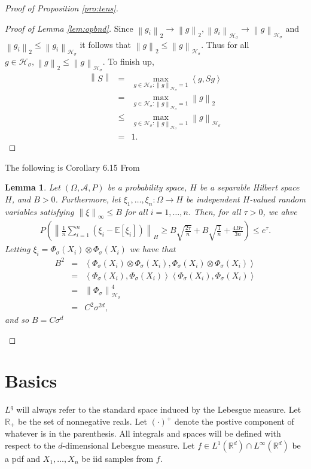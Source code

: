 \documentclass{article} %
\def\hsig{{\mathcal{H}_\sigma}}
\def\fm{{\Phi_\sigma}} %
\def\rn{\mathbb{R}}
\def\l{\left}
\def\r{\right}
\newtheorem{lem}{Lemma}
\theoremstyle{definition}
\begin{document}
\begin{proof}[Proof of Proposition \ref{pro:tens}]
\begin{proof}[Proof of Lemma \ref{lem:opbnd}]
                    Since $\l\| g_i \r\|_2 \to \l\|g\r\|_2, \l\|g_i\r\|_\hsig \to \l\|g\r\|_\hsig$ and $\l\|g_i\r\|_2 \le \l\|g_i\r\|_\hsig$ it follows that $\l\|g\r\|_2 \le \l\|g\r\|_\hsig$. Thus for all $g\in \hsig, \l\|g\r\|_2 \le \l\|g\r\|_\hsig$. To finish up,
                    \begin{eqnarray*}
                        \l\|S\r\|
                        &=& \max_{g\in \hsig: \l\|g\r\|_\hsig = 1} \l<g,Sg\r>\\
                        &=& \max_{g\in \hsig: \l\|g\r\|_\hsig = 1} \l\|g\r\|_2\\
                        &\le& \max_{g\in \hsig: \l\|g\r\|_\hsig = 1} \l\|g\r\|_\hsig\\
                        &=&  1.
                    \end{eqnarray*}
	\end{proof}
        The following is Corollary 6.15 From \cite{steinwart08}
        \begin{lem}\label{lem:hsconc}
        Let $\left( \Omega,\mathcal{A},P \right)$ be a probability space, $H$ be a separable Hilbert space $H$, and $B>0$. Furthermore, let $\xi_1,\ldots,\xi_n: \Omega \to H$ be independent $H$-valued random variables satisfying $\l\|\xi\r\|_\infty\le B$ for all $i = 1,\ldots,n$. Then, for all $\tau>0$, we ahve
        \begin{eqnarray*}
            P\left( \l\|\frac{1}{n}\sum_{i=1}^n\left( \xi_i - \mathbb{E} \left[ \xi_i \right] \right)\r\|_H \ge B \sqrt{\frac{2 \tau}{n}} + B \sqrt{\frac{1}{n}} + \frac{4B\tau}{3n} \right) \le e^\tau.
        \end{eqnarray*}
        Letting $\xi_i = \fm(X_i)\otimes \fm(X_i)$ we have that
        \begin{eqnarray*}
            B^2 
            &=&  \l<\fm(X_i)\otimes \fm(X_i) , \fm(X_i)\otimes \fm(X_i)\r>\\
            &=&  \l<\fm(X_i) , \fm(X_i)\r> \l<\fm(X_i) , \fm(X_i)\r>\\
            &=&  \l\|\fm\r\|_\hsig^4\\
            &=& C^2 \sigma^{2d},
        \end{eqnarray*}
        and so $B = C\sigma^d$
        \end{lem}

\end{proof}
\section{Basics}
$L^q$ will always refer to the standard space induced by the Lebesgue measure.
Let $\rn_+$ be the set of nonnegative reals. Let $\left( \cdot \right)^+$ denote the postive component of whatever is in the parenthesis.
All integrals and spaces will be defined with respect to the $d$-dimensional Lebesgue measure. Let $f \in L^1\left(  \rn^d\right) \cap L^\infty\left(  \rn^d\right)$ be a pdf and $X_1,\dots, X_n$ be iid samples from $f$.
\end{document}
